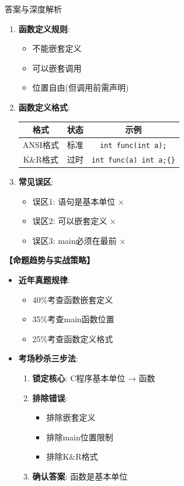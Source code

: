 \documentclass[a4paper,12pt]{article}
\begin{document}
\begin{bluebox}{答案与深度解析}
\begin{enumerate}[leftmargin=*, nosep]
		\item \textbf{函数定义规则}:
		      \begin{itemize}
			      \item 不能嵌套定义
			      \item 可以嵌套调用
			      \item 位置自由(但调用前需声明)
		      \end{itemize}

		\item \textbf{函数定义格式}:
		      \begin{tabular}{|c|c|c|}
			      \hline
			      \textbf{格式} & \textbf{状态} & \textbf{示例}                     \\
			      \hline
			      ANSI格式      & 标准          & \texttt{int func(int a);}       \\
			      \hline
			      K\&R格式      & 过时          & \texttt{int func(a) int a;\{\}} \\
			      \hline
		      \end{tabular}

		\item \textbf{常见误区}:
		      \begin{itemize}
			      \item 误区1: 语句是基本单位 ×
			      \item 误区2: 可以嵌套定义 ×
			      \item 误区3: main必须在最前 ×
		      \end{itemize}
	\end{enumerate}

	\textbf{【命题趋势与实战策略】}
	\begin{itemize}[leftmargin=*, nosep]
		\item \textbf{近年真题规律}:
		      \begin{itemize}
			      \item 40\%考查函数嵌套定义
			      \item 35\%考查main函数位置
			      \item 25\%考查函数定义格式
		      \end{itemize}

		\item \textbf{考场秒杀三步法}:
		      \begin{enumerate}
			      \item \textbf{锁定核心}: C程序基本单位 → 函数
			      \item \textbf{排除错误}:
			            \begin{itemize}
				            \item 排除嵌套定义
				            \item 排除main位置限制
				            \item 排除K\&R格式
			            \end{itemize}
			      \item \textbf{确认答案}: 函数是基本单位
		      \end{enumerate}


\end{itemize}
\end{bluebox}
\end{document}
